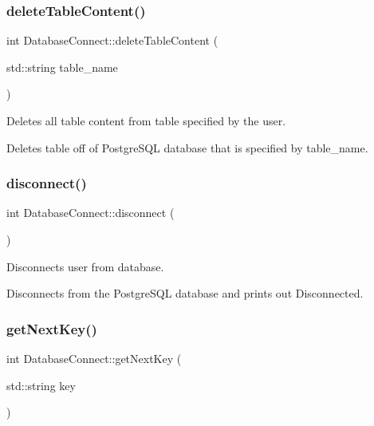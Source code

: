 \subsubsection{\texorpdfstring{delete\+Table\+Content()}{deleteTableContent()}}
{\footnotesize\ttfamily int Database\+Connect\+::delete\+Table\+Content (\begin{DoxyParamCaption}\item[{std\+::string}]{table\+\_\+name }\end{DoxyParamCaption})}



Deletes all table content from table specified by the user. 

Deletes table off of Postgre\+S\+QL database that is specified by table\+\_\+name. \mbox{\label{classDatabaseConnect_a1a276c7ee1c41f1ba38ff6e31f804f83}} 
\subsubsection{\texorpdfstring{disconnect()}{disconnect()}}
{\footnotesize\ttfamily int Database\+Connect\+::disconnect (\begin{DoxyParamCaption}{ }\end{DoxyParamCaption})}



Disconnects user from database. 

Disconnects from the Postgre\+S\+QL database and prints out \textquotesingle{}Disconnected\textquotesingle{}. \mbox{\label{classDatabaseConnect_a09195941dbccc3a9ae41edc9440f0513}} 
\subsubsection{\texorpdfstring{get\+Next\+Key()}{getNextKey()}}
{\footnotesize\ttfamily int Database\+Connect\+::get\+Next\+Key (\begin{DoxyParamCaption}\item[{std\+::string}]{key }\end{DoxyParamCaption})}



